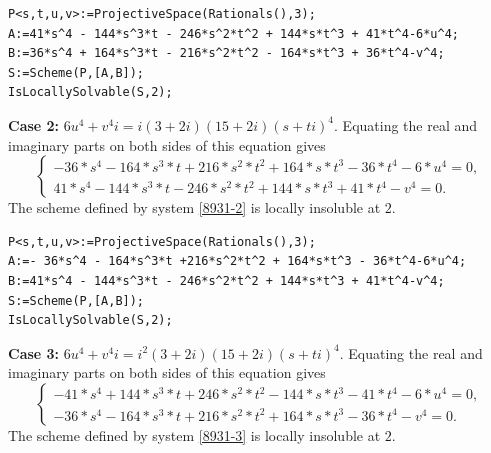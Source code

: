 \documentclass[a4paper,12pt,english,reqno]{amsart}
\begin{document}

\begin{lstlisting}
P<s,t,u,v>:=ProjectiveSpace(Rationals(),3);
A:=41*s^4 - 144*s^3*t - 246*s^2*t^2 + 144*s*t^3 + 41*t^4-6*u^4;
B:=36*s^4 + 164*s^3*t - 216*s^2*t^2 - 164*s*t^3 + 36*t^4-v^4;
S:=Scheme(P,[A,B]);
IsLocallySolvable(S,2);
\end{lstlisting}

{\bf Case 2:} $6u^4+v^4i=i(3+2i)(15+2i)(s+ti)^4$. Equating the real and imaginary parts on both sides of this equation gives
\begin{equation}\label{8931-2}
\begin{cases}
-36*s^4 - 164*s^3*t + 216*s^2*t^2 + 164*s*t^3 - 36*t^4 - 6*u^4=0,\\
41*s^4 - 144*s^3*t - 246*s^2*t^2 + 144*s*t^3 + 41*t^4 - v^4=0.
\end{cases}
\end{equation}
The scheme defined by system \eqref{8931-2} is locally insoluble at $2$.

\begin{lstlisting}
P<s,t,u,v>:=ProjectiveSpace(Rationals(),3);
A:=- 36*s^4 - 164*s^3*t +216*s^2*t^2 + 164*s*t^3 - 36*t^4-6*u^4;
B:=41*s^4 - 144*s^3*t - 246*s^2*t^2 + 144*s*t^3 + 41*t^4-v^4;
S:=Scheme(P,[A,B]);
IsLocallySolvable(S,2);
\end{lstlisting}
{\bf Case 3:} $6u^4+v^4i=i^2(3+2i)(15+2i)(s+ti)^4$.  Equating the real and imaginary parts on both sides of this equation gives
\begin{equation}\label{8931-3}
\begin{cases}
-41*s^4 + 144*s^3*t + 246*s^2*t^2 - 144*s*t^3 - 41*t^4 - 6*u^4=0,\\
-36*s^4 - 164*s^3*t + 216*s^2*t^2 + 164*s*t^3 - 36*t^4 - v^4=0.
\end{cases}
\end{equation}
The scheme defined by system \eqref{8931-3} is locally insoluble at $2$.
\end{document}
